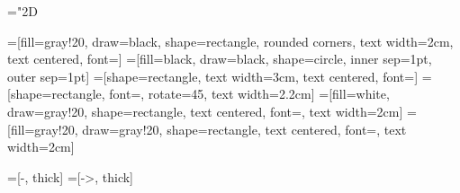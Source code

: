 \newcommand{\eq}[1]{Eq.~\eqref{#1}}
\newcommand{\fig}[1]{Fig.~\ref{#1}}
\newcommand{\ot}{\href{https://openturns.github.io/www/}{\texttt{OpenTURNS}~}}

\newcommand*\what[1]{\widehat{#1}}
\newcommand*\wtilde[1]{\widetilde{#1}}
\def\cg{\check{g}}
\def\wg{\what{g}}
\mathchardef\mhyphen="2D


\def\0b{\mathbf{0}}
\def\Db{\mathbf{D}}
\def\kb{\mathbf{k}}
\def\Kb{\mathbf{K}}
\def\Ib{\mathbf{I}}
\def\Sb{\mathbf{S}}
\def\GP{\mathsf{GP}}
\newcommand{\bea}{\begin{eqnarray*}}
\newcommand{\eea}{\end{eqnarray*}}
\newcommand{\be}{\begin{eqnarray}}
\newcommand{\ee}{\end{eqnarray}}
\def\wb{\mathbf{w}}
\def\SE{{\mathcal{E}}}%
\def\SN{{\mathcal{N}}}%
\def\pb{\mathbf{p}}
\newcommand{\Kbarbar}{\overline{K}_{|m}}
\newcommand{\Kbarbarb}{\overline{\Kb}_{|m}}
\def\mve{\varepsilon}
\newcommand{\Kbarbarp}{\overline{K'}_{|m}}
\newcommand{\Kbarbarpb}{\overline{\Kb'}_{|m}}
\newcommand{\fin} {\mbox{}~\hfill{\lower-0.3ex\hbox{$\triangleleft$}}}
\def\e1{\mathrm{e}}



=[fill={gray!20}, draw=black, shape=rectangle, rounded corners, text width=2cm, text centered, font={\scriptsize}]
=[fill=black, draw=black, shape=circle, inner sep=1pt, outer sep=1pt]
=[shape=rectangle, text width=3cm, text centered, font={\scriptsize}]
=[shape=rectangle, font={\scriptsize}, rotate=45, text width=2.2cm]
=[fill=white, draw={gray!20}, shape=rectangle, text centered, font={\scriptsize}, text width=2cm]
=[fill={gray!20}, draw={gray!20}, shape=rectangle, text centered, font={\scriptsize}, text width=2cm]

=[-, thick]
=[->, thick]





